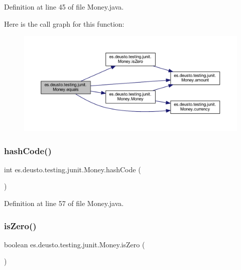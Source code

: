 Definition at line 45 of file Money.\+java.

Here is the call graph for this function\+:
\nopagebreak
\begin{figure}[H]
\begin{center}
\leavevmode
\includegraphics[width=350pt]{classes_1_1deusto_1_1testing_1_1junit_1_1_money_a2356df38b8e9ecdd969bab11d6dd301b_cgraph}
\end{center}
\end{figure}
\mbox{\label{classes_1_1deusto_1_1testing_1_1junit_1_1_money_af6cfb5b27bf97170d990dea12de04f37}} 
\subsubsection{\texorpdfstring{hashCode()}{hashCode()}}
{\footnotesize\ttfamily int es.\+deusto.\+testing.\+junit.\+Money.\+hash\+Code (\begin{DoxyParamCaption}{ }\end{DoxyParamCaption})}



Definition at line 57 of file Money.\+java.

\mbox{\label{classes_1_1deusto_1_1testing_1_1junit_1_1_money_a797658a03260b535e9a36ebbcc3b19c9}} 
\subsubsection{\texorpdfstring{isZero()}{isZero()}}
{\footnotesize\ttfamily boolean es.\+deusto.\+testing.\+junit.\+Money.\+is\+Zero (\begin{DoxyParamCaption}{ }\end{DoxyParamCaption})}

